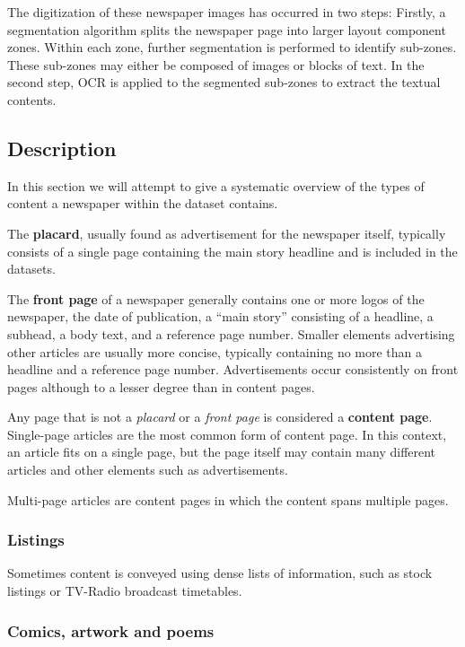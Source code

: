 \documentclass[oneside, english, bibtex]{kththesis}
\begin{document}
The digitization of these newspaper images has occurred in two steps: Firstly, a segmentation algorithm splits the newspaper page into larger layout component zones. Within each zone, further segmentation is performed to identify sub-zones. These sub-zones may either be composed of images or blocks of text. In the second step, OCR is applied to the segmented sub-zones to extract the textual contents.

\subsection{Description}

In this section we will attempt to give a systematic overview of the types of content a newspaper within the dataset contains.

The \textbf{placard}, usually found as advertisement for the newspaper itself, typically consists of a single page containing the main story headline and is included in the datasets.

The \textbf{front page} of a newspaper generally contains one or more logos of the newspaper,
the date of publication, a “main story” consisting of a headline, a subhead, a body text, and a reference page number.
Smaller elements advertising other articles are usually more concise, typically containing no more than a headline and a reference page number.
Advertisements occur consistently on front pages although to a lesser degree than in content pages.

Any page that is not a \textit{placard} or a \textit{front page} is considered a \textbf{content page}. Single-page articles are the most common form of content page.
In this context, an article fits on a single page, but the page itself may contain many different articles and other elements such as advertisements.

Multi-page articles are content pages in which the content spans multiple pages.

\subsubsection{Listings}
\label{bgsubsec:listings}
Sometimes content is conveyed using dense lists of information, such as stock listings or TV-Radio broadcast timetables.

\subsubsection{Comics, artwork and poems}
\end{document}

